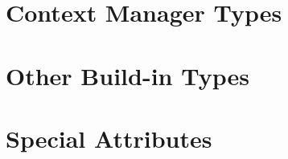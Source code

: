 \section{Context Manager Types}





\section{Other Build-in Types}





\section{Special Attributes}






